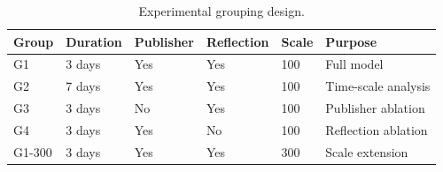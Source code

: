 \begin{table}[t]
\centering
\caption{Experimental grouping design.}
\label{tab:experiment_groups}
\begin{tabular}{llllll}
\toprule
Group & Duration & Publisher & Reflection & Scale & Purpose \\
\midrule
G1 & 3 days & Yes & Yes & 100 & Full model \\
G2 & 7 days & Yes & Yes & 100 & Time-scale analysis \\
G3 & 3 days & No & Yes & 100 & Publisher ablation \\
G4 & 3 days & Yes & No & 100 & Reflection ablation \\
G1-300 & 3 days & Yes & Yes & 300 & Scale extension \\
\bottomrule
\end{tabular}
\end{table}
